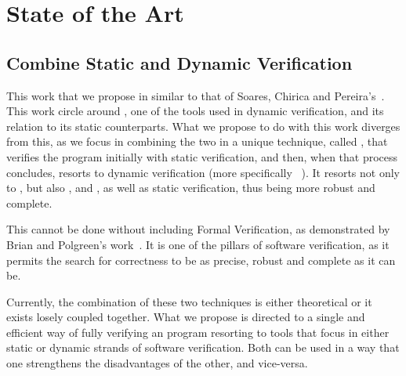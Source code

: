 
%

\makeatletter
\newcommand{\ntifpkgloaded}{%
  \@ifpackageloaded%
}
\makeatother


\chapter{State of the Art}
\label{cha:state_of_the_art}


\section{Combine Static and Dynamic Verification}
\label{sec:combine_static_and_dynamic_verification}

This work that we propose in similar to that of Soares, Chirica and Pereira's~\cite{Soares_Chirica_Pereira2024}. 
  This work circle around \gospellang, one of the tools used in 
dynamic verification, and its relation to its static counterparts. What we propose to do with this work 
diverges from this, as we focus in combining the two in a unique technique, called \monitors, that 
verifies the program initially with static verification, and then, when that process concludes, resorts to 
dynamic verification (more specifically \rac~\cite{Filliatre_Jean-Christophe}). It resorts not only to 
\gospellang, but also \ortac, \why and \cameleer, as well as static verification, thus being more robust and 
complete.

This cannot be done without including Formal Verification, as demonstrated by Brian and Polgreen's 
work~\cite{Brian_Polgreen2025}. It is one of the pillars of software verification, as it permits the search for correctness 
to be as precise, robust and complete as it can be.

Currently, the combination of these two techniques is either theoretical or it exists losely coupled together. 
What we propose is directed to a single and efficient way of fully verifying an \ocaml program resorting to 
tools that focus in either static or dynamic strands of software verification. Both can be used in a way that 
one strengthens the disadvantages of the other, and vice-versa.